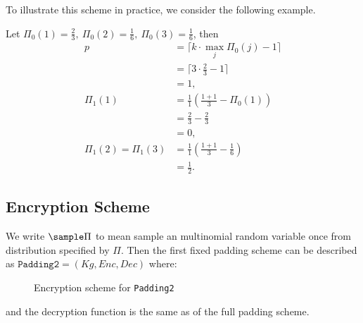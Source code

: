 To illustrate this scheme in practice, we consider the following example.
\begin{example} \label{example 1}
Let $\Pi_0(1) = \frac{2}{3}, \ \Pi_0(2) = \frac{1}{6}, \ \Pi_0(3) = \frac{1}{6}$, then
\begin{align*}
	p & = \lceil k \cdot \max_{j}{\Pi_0(j)} - 1 \rceil \\
	  & = \lceil 3 \cdot \frac{2}{3} - 1 \rceil	\\
	  & = 1,	\\
	\Pi_1(1) & = \frac{1}{1} \left( \frac{1+1}{3} - \Pi_0(1) \right) \\
			 & = \frac{2}{3} - \frac{2}{3} \\
			 & = 0,	\\
	\Pi_1(2) = \Pi_1(3) & = \frac{1}{1} \left( \frac{1+1}{3} - \frac{1}{6} \right) \\
						& = \frac{1}{2}.
\end{align*}
\end{example}


\subsection{Encryption Scheme}
We write $\sample \Pi$ to mean sample an multinomial random variable once from distribution specified by $\Pi$. Then the first fixed padding scheme can be described as $\texttt{Padding2} = (Kg, Enc, Dec)$ where:


\begin{figure}[H]
\begin{center}
\begin{pchstack}
	
	\pchspace
\end{pchstack}
\end{center}
\caption{Encryption scheme for \texttt{Padding2}}
\end{figure}
and the decryption function is the same as of the full padding scheme.


